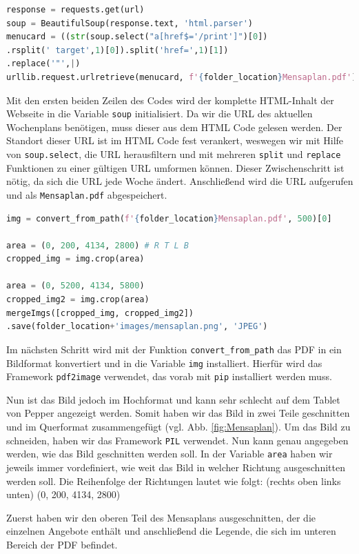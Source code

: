\begin{lstlisting}[language=Python]
response = requests.get(url)
soup = BeautifulSoup(response.text, 'html.parser')
menucard = ((str(soup.select("a[href$='/print']")[0])
.rsplit(' target',1)[0]).split('href=',1)[1])
.replace('"',|)
urllib.request.urlretrieve(menucard, f'{folder_location}Mensaplan.pdf')
\end{lstlisting}

Mit den ersten beiden Zeilen des Codes wird der komplette HTML-Inhalt der Webseite in die Variable \verb|soup| initialisiert. Da wir die URL des aktuellen Wochenplans benötigen, muss dieser aus dem HTML Code gelesen werden. Der Standort dieser URL ist im HTML Code fest verankert, weswegen wir mit Hilfe von \verb|soup.select|, die URL herausfiltern und mit mehreren \verb|split| und \verb|replace| Funktionen zu einer gültigen URL umformen können. Dieser Zwischenschritt ist nötig, da sich die URL jede Woche ändert. Anschließend wird die URL aufgerufen und als \verb|Mensaplan.pdf| abgespeichert.\\

\begin{lstlisting}[language=Python]
img = convert_from_path(f'{folder_location}Mensaplan.pdf', 500)[0]

area = (0, 200, 4134, 2800) # R T L B
cropped_img = img.crop(area)

area = (0, 5200, 4134, 5800)
cropped_img2 = img.crop(area)
mergeImgs([cropped_img, cropped_img2])
.save(folder_location+'images/mensaplan.png', 'JPEG')
\end{lstlisting}

Im nächsten Schritt wird mit der Funktion \verb|convert_from_path| das PDF in ein Bildformat konvertiert und in die Variable \verb|img| installiert. Hierfür wird das Framework \verb|pdf2image| verwendet, das vorab mit \verb|pip| installiert werden muss. 

Nun ist das Bild jedoch im Hochformat und kann sehr schlecht auf dem Tablet von Pepper angezeigt werden. Somit haben wir das Bild in zwei Teile geschnitten und im Querformat zusammengefügt (vgl. Abb. \ref{fig:Mensaplan}). Um das Bild zu schneiden, haben wir das Framework \verb|PIL| verwendet. Nun kann genau angegeben werden, wie das Bild geschnitten werden soll. In der Variable \verb|area| haben wir jeweils immer vordefiniert, wie weit das Bild in welcher Richtung ausgeschnitten werden soll. Die Reihenfolge der Richtungen lautet wie folgt: 
(rechts oben links unten) (0, 200, 4134, 2800)

Zuerst haben wir den oberen Teil des Mensaplans ausgeschnitten, der die einzelnen Angebote enthält und anschließend die Legende, die sich im unteren Bereich der PDF befindet. 

